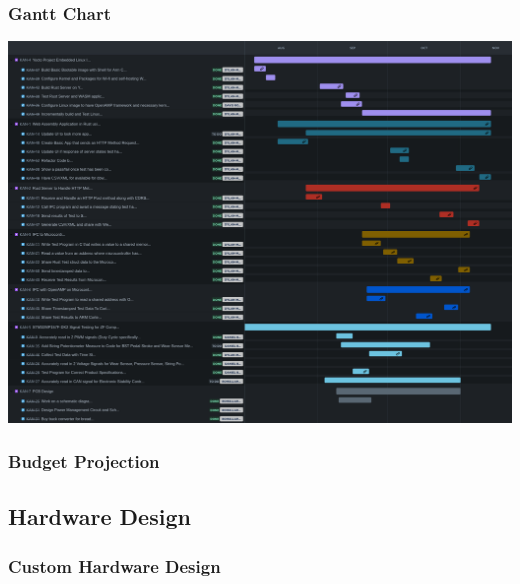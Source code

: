 \documentclass[8pt,compress]{beamer}
\begin{document}
\begin{frame}
  \frametitle{Gantt Chart}
  \includegraphics[height=\dimexpr\paperheight-1.5cm\relax]{assets/diagrams/gantt.png}
\end{frame}
\begin{frame}
  \frametitle{Budget Projection}
  \vspace{-.2025cm}
\end{frame}

\subsection{Hardware Design}
\begin{frame}
  \frametitle{Custom Hardware Design}
\end{frame}
\end{document}
